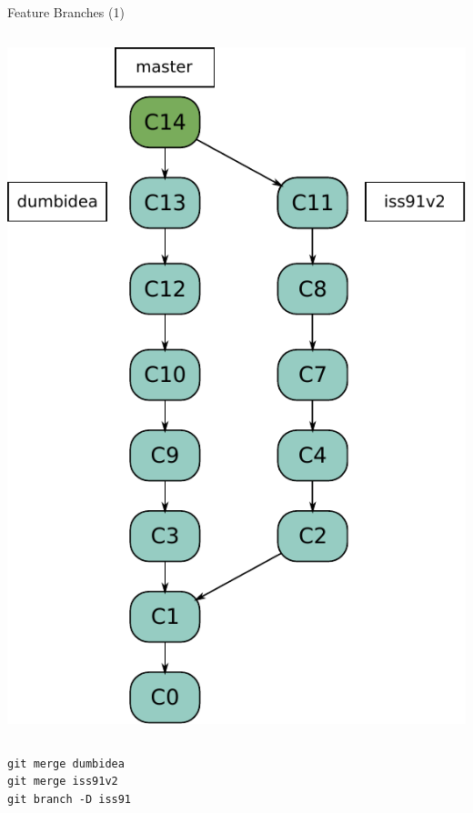 \begin{frame}{Feature Branches (1)}
\begin{columns}[T]
\begin{column}{.45\textwidth}
\begin{block}{}
        \pause \includegraphics[scale=0.4]{images/feature-branches2.pdf}
    \end{block}
  \end{column}
\end{columns}  
\begin{tiny}
\pause \texttt{git merge dumbidea} \\
\pause \texttt{git merge iss91v2} \\
\pause \texttt{git branch -D iss91} \\
\end{tiny}
\end{frame}

